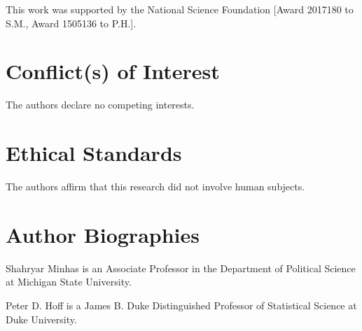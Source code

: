 \documentclass[12pt,onesided]{amsart}
\begin{document}
This work was supported by the National Science Foundation [Award 2017180 to S.M., Award 1505136 to P.H.].

\section*{Conflict(s) of Interest}

The authors declare no competing interests.

\section*{Ethical Standards}

The authors affirm that this research did not involve human subjects.

\clearpage




\clearpage 



\clearpage

\section*{Author Biographies}

Shahryar Minhas is an Associate Professor in the Department of Political Science at Michigan State University. 

Peter D. Hoff is a James B. Duke Distinguished Professor of Statistical Science at Duke University.

\clearpage
\end{document}

